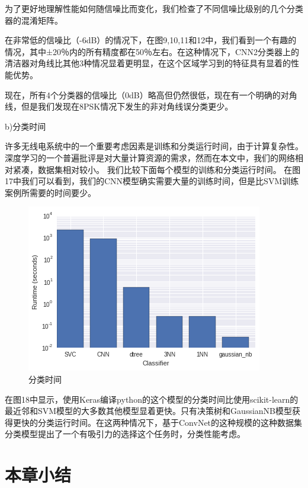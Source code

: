 为了更好地理解性能如何随信噪比而变化，我们检查了不同信噪比级别的几个分类器的混淆矩阵。\par

在非常低的信噪比（-6dB）的情况下，在图9,10,11和12中，我们看到一个有趣的情况，其中±20％内的所有精度都在50％左右。在这种情况下，CNN2分类器上的清洁器对角线比其他3种情况显着更明显，在这个区域学习到的特征具有显着的性能优势。\par

现在，所有4个分类器的信噪比（0dB）略高但仍然很低，现在有一个明确的对角线，但是我们发现在8PSK情况下发生的非对角线误分类更少。\par

b)分类时间

许多无线电系统中的一个重要考虑因素是训练和分类运行时间，由于计算复杂性。 深度学习的一个普遍批评是对大量计算资源的需求，然而在本文中，我们的网络相对紧凑，数据集相对较小。 我们比较下面每个模型的训练和分类运行时间。 在图17中我们可以看到，我们的CNN模型确实需要大量的训练时间，但是比SVM训练案例所需要的时间要少。\par
\begin{figure}[!h]
	\centering
	\includegraphics[scale=0.5]{figures/chapter_3/train_time}
	\caption{分类时间}	\label{sec:fig_3_13}
\end{figure}

在图18中显示，使用Keras编译python的这个模型的分类时间比使用scikit-learn的最近邻和SVM模型的大多数其他模型显着更快。只有决策树和GaussianNB模型获得更快的分类运行时间。在这两种情况下，基于ConvNet的这种规模的这种数据集分类模型提出了一个有吸引力的选择这个任务时，分类性能考虑。\par


\section{本章小结}

